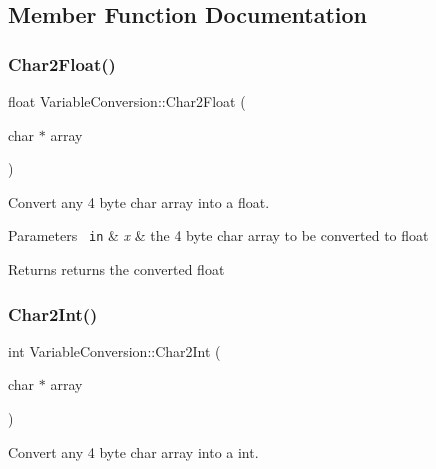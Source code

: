 \subsection{Member Function Documentation}
\mbox{\label{class_variable_conversion_ad306788e148ee803542922852f91026f}} 
\subsubsection{\texorpdfstring{Char2Float()}{Char2Float()}}
{\footnotesize\ttfamily float Variable\+Conversion\+::\+Char2\+Float (\begin{DoxyParamCaption}\item[{char $\ast$}]{array }\end{DoxyParamCaption})\hspace{0.3cm}{\ttfamily [inline]}}



Convert any 4 byte char array into a float. 


\begin{DoxyParams}[1]{Parameters}
\mbox{\texttt{ in}}  & {\em x} & the 4 byte char array to be converted to float\\
\hline
\end{DoxyParams}
\begin{DoxyReturn}{Returns}
returns the converted float 
\end{DoxyReturn}
\mbox{\label{class_variable_conversion_a2a461a2be2edffa001a019022e5fc724}} 
\subsubsection{\texorpdfstring{Char2Int()}{Char2Int()}}
{\footnotesize\ttfamily int Variable\+Conversion\+::\+Char2\+Int (\begin{DoxyParamCaption}\item[{char $\ast$}]{array }\end{DoxyParamCaption})\hspace{0.3cm}{\ttfamily [inline]}}



Convert any 4 byte char array into a int. 



